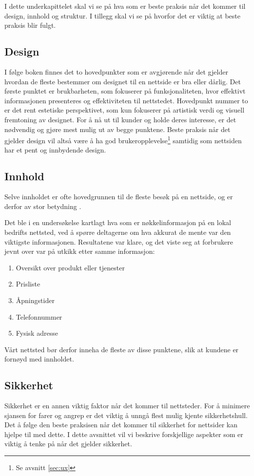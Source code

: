 I dette underkapittelet skal vi se på hva som er beste praksis når det kommer til design, innhold og struktur. I tillegg skal vi se på hvorfor det er viktig at beste praksis blir fulgt.

\subsection{Design}
\label{sec:design}
I følge boken  \cite[s.~5]{beaird2014tpo} finnes det to hovedpunkter som er avgjørende når det gjelder hvordan de fleste bestemmer om designet til en nettside er bra eller dårlig. Det første punktet er brukbarheten, som fokuserer på funksjonaliteten, hvor effektivt informasjonen presenteres og effektiviteten til nettstedet. Hovedpunkt nummer to er det rent estetiske perspektivet, som kun fokuserer på artistisk verdi og visuell fremtoning av designet. For å nå ut til kunder og holde deres interesse, er det nødvendig og gjøre mest mulig ut av begge punktene. Beste praksis når det gjelder design vil altså være å ha god brukeropplevelse\footnote{Se avsnitt \ref{sec:ux}} samtidig som nettsiden har et pent og innbydende design.

\subsection{Innhold}
Selve innholdet er ofte hovedgrunnen til de fleste besøk på en nettside, og er derfor av stor betydning \cite{thielsch2014ueo}.

Det ble i en undersøkelse \cite{marchant18wdc} kartlagt hva som er nøkkelinformasjon på en lokal bedrifts nettsted, ved å spørre deltagerne om hva akkurat de mente var den viktigste informasjonen. Resultatene var klare, og det viste seg at forbrukere jevnt over var på utkikk etter samme informasjon:
\begin{enumerate}
\item Oversikt over produkt eller tjenester
\item Prisliste
\item Åpningstider
\item Telefonnummer
\item Fysisk adresse
\end{enumerate}

Vårt nettsted bør derfor inneha de fleste av disse punktene, slik at kundene er fornøyd med innholdet.

\subsection{Sikkerhet}
\label{sec:analysis-security}
Sikkerhet er en annen viktig faktor når det kommer til nettsteder. For å minimere sjansen for farer og angrep er det viktig å unngå flest mulig kjente sikkerhetshull. Det å følge den beste praksisen når det kommer til sikkerhet for nettsider kan hjelpe til med dette. I dette avsnittet vil vi beskrive forskjellige aspekter som er viktig å tenke på når det gjelder sikkerhet.
 
